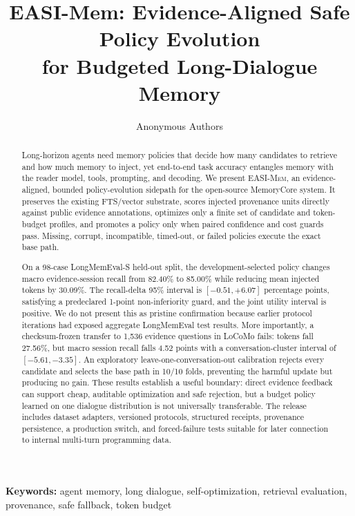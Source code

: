 \documentclass[10pt]{article}
\title{\vspace{-1.2em}\textbf{EASI-Mem: Evidence-Aligned Safe Policy Evolution\\for Budgeted Long-Dialogue Memory}}
\author{Anonymous Authors}
\date{}
\newcommand{\method}{\textsc{EASI-Mem}\xspace}
\begin{document}
\maketitle
\vspace{-1.2em}

\begin{abstract}
Long-horizon agents need memory policies that decide how many candidates to
retrieve and how much memory to inject, yet end-to-end task accuracy entangles
memory with the reader model, tools, prompting, and decoding. We present
\method, an evidence-aligned, bounded policy-evolution sidepath for the
open-source MemoryCore system. It preserves the existing FTS/vector substrate,
scores injected provenance units directly against public evidence annotations,
optimizes only a finite set of candidate and token-budget profiles, and promotes
a policy only when paired confidence and cost guards pass. Missing, corrupt,
incompatible, timed-out, or failed policies execute the exact base path.

On a 98-case LongMemEval-S held-out split, the development-selected policy
changes macro evidence-session recall from 82.40\% to 85.00\% while reducing
mean injected tokens by 30.09\%. The recall-delta 95\% interval is
$[-0.51,+6.07]$ percentage points, satisfying a predeclared 1-point
non-inferiority guard, and the joint utility interval is positive. We do not
present this as pristine confirmation because earlier protocol iterations had
exposed aggregate LongMemEval test results. More importantly, a
checksum-frozen transfer to 1,536 evidence questions in LoCoMo fails: tokens
fall 27.56\%, but macro session recall falls 4.52 points with a
conversation-cluster interval of $[-5.61,-3.35]$. An exploratory
leave-one-conversation-out calibration rejects every candidate and selects the
base path in 10/10 folds, preventing the harmful update but producing no gain.
These results establish a useful boundary: direct evidence feedback can support
cheap, auditable optimization and safe rejection, but a budget policy learned
on one dialogue distribution is not universally transferable. The release
includes dataset adapters, versioned protocols, structured receipts,
provenance persistence, a production switch, and forced-failure tests suitable
for later connection to internal multi-turn programming data.
\end{abstract}

\noindent\textbf{Keywords:} agent memory, long dialogue, self-optimization,
retrieval evaluation, provenance, safe fallback, token budget
\end{document}
